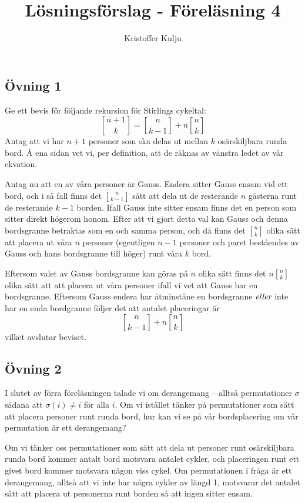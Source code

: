 \documentclass{article}
\title{Lösningsförslag - Föreläsning 4}
\author{Kristoffer Kulju}
\begin{document}
\maketitle

\subsection*{Övning 1}
Ge ett bevis för följande rekursion för Stirlings cykeltal:
$$
{n + 1 \brack k} = {n \brack k - 1} + n{n \brack k}
$$
Antag att vi har $n+1$ personer som ska delas ut mellan $k$ osärskiljbara runda bord. Å ena sidan vet vi, per definition, att de räknas av vänstra ledet av vår ekvation. 

Antag nu att en av våra personer är Gauss. Endera sitter Gauss ensam vid ett bord, och i så fall finns det ${n \brack k - 1}$ sätt att dela ut de resterande $n$ gästerna runt de resterande $k-1$ borden. Ifall Gauss inte sitter ensam finns det en person som sitter direkt högerom honom. Efter att vi gjort detta val kan Gauss och denna bordsgranne betraktas som en och samma person, och då finns det ${n \brack k}$ olika sätt att placera ut våra $n$ personer (egentligen $n - 1$ personer och paret beståendes av Gauss och hans bordsgranne till höger) runt våra $k$ bord. 

Eftersom valet av Gauss bordsgranne kan göras på $n$ olika sätt finns det $n{n \brack k}$ olika sätt att att placera ut våra personer ifall vi vet att Gauss har en bordsgranne. Eftersom Gauss endera har åtminståne en bordsgranne $\emph{eller}$ inte har en enda bordgranne följer det att antalet placeringar är $$
{n \brack k - 1} + n{n \brack k}
$$ vilket avslutar beviset.
 
\subsection*{Övning 2}
I slutet av förra föreläsningen talade vi om derangemang – alltså permutationer $\sigma$ sådana att $\sigma(i)\neq i$ för alla $i$. Om vi istället tänker på permutationer som sätt att placera personer runt runda bord, hur kan vi se på vår bordsplacering om vår permutation är ett derangemang?

Om vi tänker oss permutationer som sätt att dela ut personer runt osärskiljbara runda bord kommer antalt bord motsvara antalet cykler, och placeringen runt ett givet bord kommer motsvara någon viss cykel. Om permutationen i fråga är ett derangemang, alltså att vi inte har några cykler av längd 1, motsvarar det antalet sätt att placera ut personerna runt borden så att ingen sitter ensam. 
\end{document}
